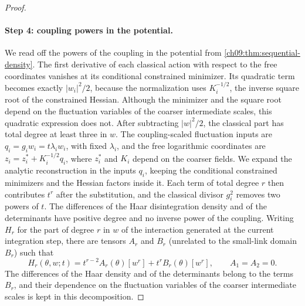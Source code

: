 \begin{proof}
\paragraph{Step 4: coupling powers in the potential.}
We read off the powers of the coupling in the potential from \cref{ch09:thm:sequential-density}. The first derivative of each classical action with respect to the free coordinates vanishes at its conditional constrained minimizer. Its quadratic term becomes exactly $|w_i|^2/2$, because the normalization uses $K_i^{-1/2}$, the inverse square root of the constrained Hessian. Although the minimizer and the square root depend on the fluctuation variables of the coarser intermediate scales, this quadratic expression does not. After subtracting $|w|^2/2$, the classical part has total degree at least three in $w$. The coupling-scaled fluctuation inputs are $q_i=g_iw_i=t\lambda_iw_i$, with fixed $\lambda_i$, and the free logarithmic coordinates are $z_i=z_i^*+K_i^{-1/2}q_i$, where $z_i^*$ and $K_i$ depend on the coarser fields. We expand the analytic reconstruction in the inputs $q_i$, keeping the conditional constrained minimizers and the Hessian factors inside it. Each term of total degree $r$ then contributes $t^r$ after the substitution, and the classical divisor $g_i^2$ removes two powers of $t$. The differences of the Haar disintegration density and of the determinants have positive degree and no inverse power of the coupling. Writing $H_r$ for the part of degree $r$ in $w$ of the interaction generated at the current integration step, there are tensors $A_r$ and $B_r$ (unrelated to the small-link domain $B_r$) such that
\begin{equation}\label{ch28:eq:score-degree-decomposition}
 H_r(\theta,w;t)=t^{r-2}A_r(\theta)[w^r]+t^rB_r(\theta)[w^r],\qquad A_1=A_2=0.
\end{equation}
The differences of the Haar density and of the determinants belong to the terms $B_r$, and their dependence on the fluctuation variables of the coarser intermediate scales is kept in this decomposition.


\end{proof}
